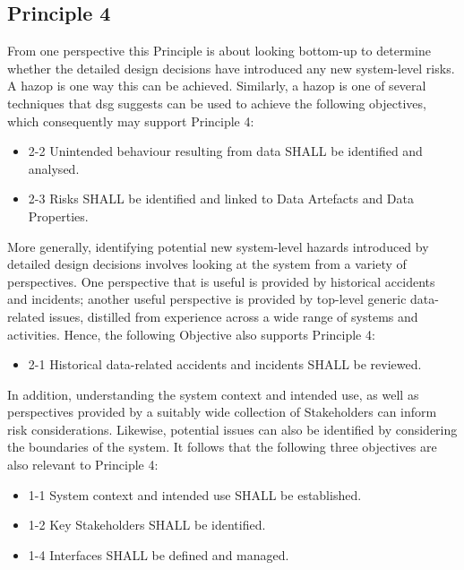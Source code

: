 \subsection{Principle 4}

From one perspective this Principle is about looking bottom-up to determine whether the detailed design decisions have introduced any new system-level risks. A \gls{hazop} is one way this can be achieved. Similarly, a \gls{hazop} is one of several techniques that \gls{dsg} suggests can be used to achieve the following objectives, which consequently may support Principle 4:

\begin{itemize}
	\item \textcolor{dsiwgAccentColour}{2-2} Unintended behaviour resulting from data SHALL be identified and analysed.
	\item \textcolor{dsiwgAccentColour}{2-3} Risks SHALL be identified and linked to Data Artefacts and Data Properties.
\end{itemize}

More generally, identifying potential new system-level hazards introduced by detailed design decisions involves looking at the system from a variety of perspectives. One perspective that is useful is provided by historical accidents and incidents; another useful perspective is provided by top-level generic data-related issues, distilled from experience across a wide range of systems and activities. Hence, the following Objective also supports Principle 4:

\begin{itemize}
	\item \textcolor{dsiwgAccentColour}{2-1} Historical data-related accidents and incidents SHALL be reviewed.
\end{itemize}

In addition, understanding the system context and intended use, as well as perspectives provided by a suitably wide collection of Stakeholders can inform risk considerations. Likewise, potential issues can also be identified by considering the boundaries of the system. It follows that the following three objectives are also relevant to Principle 4:

\begin{itemize}
	\item \textcolor{dsiwgAccentColour}{1-1} System context and intended use SHALL be established.
	\item \textcolor{dsiwgAccentColour}{1-2} Key Stakeholders SHALL be identified.
	\item \textcolor{dsiwgAccentColour}{1-4} Interfaces SHALL be defined and managed.
\end{itemize}


